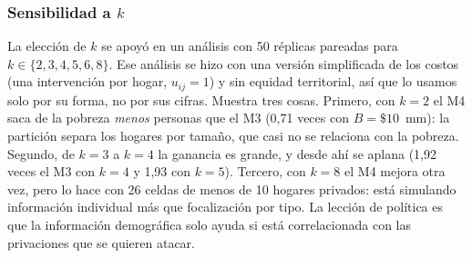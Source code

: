 \subsubsection{Sensibilidad a $k$}

La elección de $k$ se apoyó en un análisis con 50 réplicas pareadas para
$k\in\{2,3,4,5,6,8\}$. Ese análisis se hizo con una versión simplificada de los
costos (una intervención por hogar, $u_{ij}=1$) y sin equidad territorial, así que
lo usamos solo por su forma, no por sus cifras. Muestra tres cosas. Primero, con
$k=2$ el M4 saca de la pobreza \emph{menos} personas que el M3 (0,71 veces con
$B=\$10$~mm): la partición separa los hogares por tamaño, que casi no se
relaciona con la pobreza. Segundo, de $k=3$ a $k=4$ la ganancia es grande, y desde
ahí se aplana (1,92 veces el M3 con $k=4$ y 1,93 con $k=5$). Tercero, con $k=8$ el
M4 mejora otra vez, pero lo hace con 26 celdas de menos de 10 hogares privados:
está simulando información individual más que focalización por tipo. La lección
de política es que la información demográfica solo ayuda si está correlacionada
con las privaciones que se quieren atacar.

